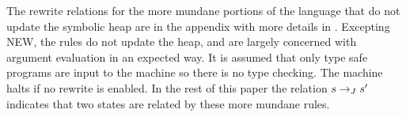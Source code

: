 The rewrite relations for the more mundane portions of the language
that do not update the symbolic heap are in the appendix with more details in 
\cite{Hillery:2015}. Excepting \textrm{N{\footnotesize EW}}, the rules do not update
the heap, and are largely concerned with argument evaluation in an
expected way. It is assumed that only type safe programs are input to
the machine so there is no type checking. The
machine halts if no rewrite is enabled. In the rest of this paper the relation $s \rightarrow_{J}
s^\prime$ indicates that two states are related by these more
mundane rules.

	

%











        
